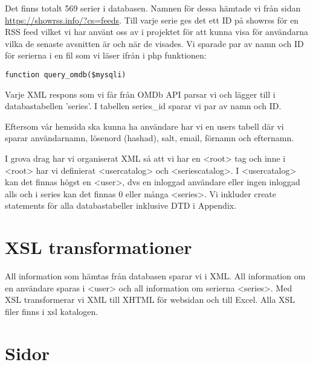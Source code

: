 Det finns totalt 569 serier i databasen. Namnen för dessa hämtade vi från sidan \url{https://showrss.info/?cs=feeds}. Till varje serie ges det ett ID på showrss för en RSS feed vilket vi har använt oss av i projektet för att kunna visa för användarna vilka de senaste avsnitten är och när de visades. Vi sparade par av namn och ID för serierna i en fil som vi läser ifrån i php funktionen: 
\begin{lstlisting}
function query_omdb($mysqli) 
\end{lstlisting}
Varje XML respons som vi får från OMDb API parsar vi och lägger till i databastabellen 'series'. I tabellen series\_id sparar vi par av namn och ID.

Eftersom vår hemsida ska kunna ha användare har vi en users tabell där vi sparar användarnamn, lösenord (hashad), salt, email, förnamn och efternamn. 

I grova drag har vi organiserat XML så att vi har en <root> tag och inne i <root> har vi definierat <usercatalog> och <seriescatalog>. I <usercatalog> kan det finnas högst en <user>, dvs en inloggad användare eller ingen inloggad alls och i series kan det finnas 0 eller många <series>. Vi inkluder create statements för alla databastabeller inklusive DTD i Appendix. 

\section{XSL transformationer}
All information som hämtas från databasen sparar vi i XML. All information om en användare sparas i <user> och all information om serierna <series>. Med XSL transformerar vi XML till XHTML för websidan och till Excel. Alla XSL filer finns i xsl katalogen.

\section{Sidor}

